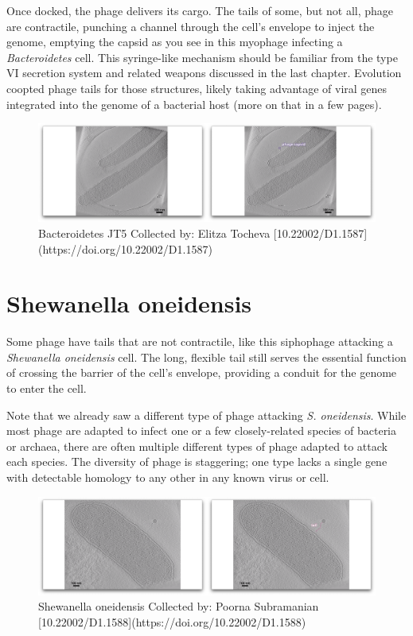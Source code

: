 \documentclass[]{tufte-book}
\begin{document}
Once docked, the phage delivers its cargo. The tails of some, but not
all, phage are contractile, punching a channel through the cell's
envelope to inject the genome, emptying the capsid as you see in this
myophage infecting a \emph{Bacteroidetes} cell. This syringe-like
mechanism should be familiar from the type VI secretion system and
related weapons discussed in the last chapter. Evolution coopted phage
tails for those structures, likely taking advantage of viral genes
integrated into the genome of a bacterial host (more on that in a few
pages).

\begin{figure}
\includegraphics{movie_stills/10_2} \caption[Bacteroidetes JT5 Collected by]{Bacteroidetes JT5 Collected by: Elitza Tocheva [10.22002/D1.1587](https://doi.org/10.22002/D1.1587)}\label{fig:unnamed-chunk-174}
\end{figure}

\section{Shewanella oneidensis}\label{shewanella-oneidensis-1}

Some phage have tails that are not contractile, like this siphophage
attacking a \emph{Shewanella oneidensis} cell. The long, flexible tail
still serves the essential function of crossing the barrier of the
cell's envelope, providing a conduit for the genome to enter the cell.

Note that we already saw a different type of phage attacking \emph{S.
oneidensis}. While most phage are adapted to infect one or a few
closely-related species of bacteria or archaea, there are often multiple
different types of phage adapted to attack each species. The diversity
of phage is staggering; one type lacks a single gene with detectable
homology to any other in any known virus or cell.

\begin{figure}
\includegraphics{movie_stills/10_3} \caption[Shewanella oneidensis Collected by]{Shewanella oneidensis Collected by: Poorna Subramanian [10.22002/D1.1588](https://doi.org/10.22002/D1.1588)}\label{fig:unnamed-chunk-175}
\end{figure}
\end{document}
